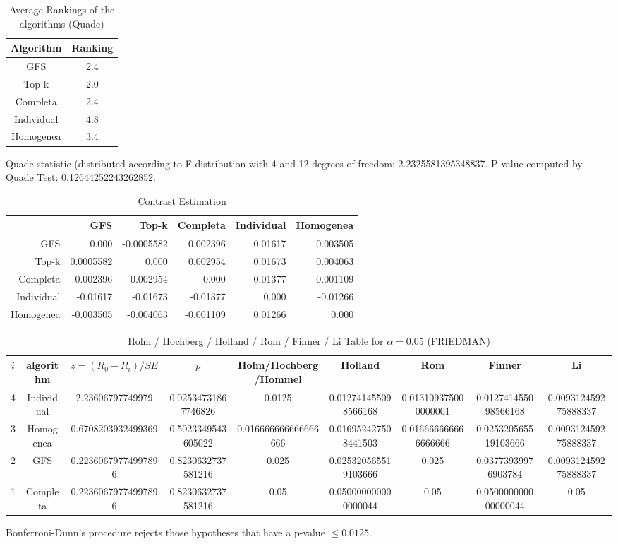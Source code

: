 \documentclass[a4paper,10pt]{article}
\begin{document}
\begin{landscape}
\newpage

\begin{table}[!htp]
\centering
\caption{Average Rankings of the algorithms (Quade)
}\begin{tabular}{c|c}
Algorithm&Ranking\\
\hline
GFS&2.4\\
Top-k&2.0\\
Completa&2.4\\
Individual&4.8\\
Homogenea&3.4\\
\end{tabular}
\end{table}
Quade statistic (distributed according to F-distribution with 4 and 12 degrees of freedom: 2.2325581395348837. 
P-value computed by Quade Test: 0.12644252243262852.\newline


\newpage

\begin{table}[!htp]
\centering\tiny
\caption{Contrast Estimation}
\begin{tabular}{
|r|r|r|r|r|r|}
\hline
 &GFS&Top-k&Completa&Individual&Homogenea\\
\hline
GFS&0.000&-0.0005582&0.002396&0.01617&0.003505\\
\hline
Top-k&0.0005582&0.000&0.002954&0.01673&0.004063\\
\hline
Completa&-0.002396&-0.002954&0.000&0.01377&0.001109\\
\hline
Individual&-0.01617&-0.01673&-0.01377&0.000&-0.01266\\
\hline
Homogenea&-0.003505&-0.004063&-0.001109&0.01266&0.000\\
\hline

\end{tabular}
\end{table}

\newpage

\begin{table}[!htp]
\centering\scriptsize
\caption{Holm / Hochberg / Holland / Rom / Finner / Li Table for $\alpha=0.05$ (FRIEDMAN)}
\begin{tabular}{ccccccccc}
$i$&algorithm&$z=(R_0 - R_i)/SE$&$p$&Holm/Hochberg/Hommel&Holland&Rom&Finner&Li\\
\hline
4&Individual&2.23606797749979&0.02534731867746826&0.0125&0.012741455098566168&0.013109375000000001&0.012741455098566168&0.009312459275888337\\
3&Homogenea&0.6708203932499369&0.5023349543605022&0.016666666666666666&0.016952427508441503&0.016666666666666666&0.025320565519103666&0.009312459275888337\\
2&GFS&0.22360679774997896&0.8230632737581216&0.025&0.025320565519103666&0.025&0.03773939976903784&0.009312459275888337\\
1&Completa&0.22360679774997896&0.8230632737581216&0.05&0.050000000000000044&0.05&0.050000000000000044&0.05\\
\hline
\end{tabular}
\end{table}
Bonferroni-Dunn's procedure rejects those hypotheses that have a p-value $\le0.0125$.



\end{landscape}
\end{document}
